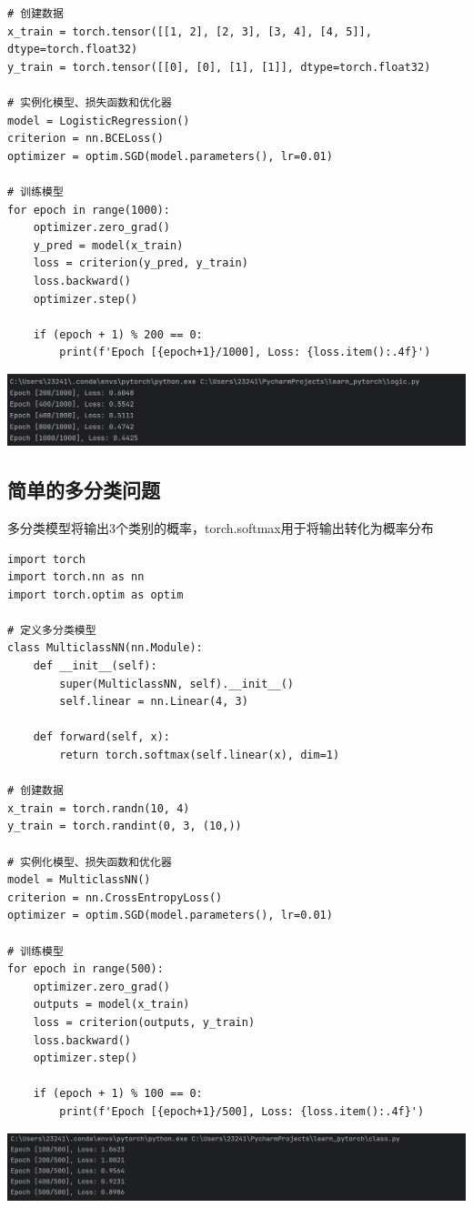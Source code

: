 \documentclass[UTF8,a4paper]{ctexart}
\begin{document}
\begin{sloppypar}
\begin{lstlisting}
# 创建数据
x_train = torch.tensor([[1, 2], [2, 3], [3, 4], [4, 5]], dtype=torch.float32)
y_train = torch.tensor([[0], [0], [1], [1]], dtype=torch.float32)

# 实例化模型、损失函数和优化器
model = LogisticRegression()
criterion = nn.BCELoss()
optimizer = optim.SGD(model.parameters(), lr=0.01)

# 训练模型
for epoch in range(1000):
    optimizer.zero_grad()
    y_pred = model(x_train)
    loss = criterion(y_pred, y_train)
    loss.backward()
    optimizer.step()

    if (epoch + 1) % 200 == 0:
        print(f'Epoch [{epoch+1}/1000], Loss: {loss.item():.4f}')
    \end{lstlisting}
	
	\includegraphics[width = 16cm]{17}
	
	\subsection{简单的多分类问题}
	多分类模型将输出3个类别的概率，torch.softmax用于将输出转化为概率分布
	\begin{lstlisting}
import torch
import torch.nn as nn
import torch.optim as optim

# 定义多分类模型
class MulticlassNN(nn.Module):
    def __init__(self):
        super(MulticlassNN, self).__init__()
        self.linear = nn.Linear(4, 3)

    def forward(self, x):
        return torch.softmax(self.linear(x), dim=1)

# 创建数据
x_train = torch.randn(10, 4)
y_train = torch.randint(0, 3, (10,))

# 实例化模型、损失函数和优化器
model = MulticlassNN()
criterion = nn.CrossEntropyLoss()
optimizer = optim.SGD(model.parameters(), lr=0.01)

# 训练模型
for epoch in range(500):
    optimizer.zero_grad()
    outputs = model(x_train)
    loss = criterion(outputs, y_train)
    loss.backward()
    optimizer.step()

    if (epoch + 1) % 100 == 0:
        print(f'Epoch [{epoch+1}/500], Loss: {loss.item():.4f}')
    \end{lstlisting}
	
	\includegraphics[width = 16cm]{18}
	

\end{sloppypar}
\end{document}
